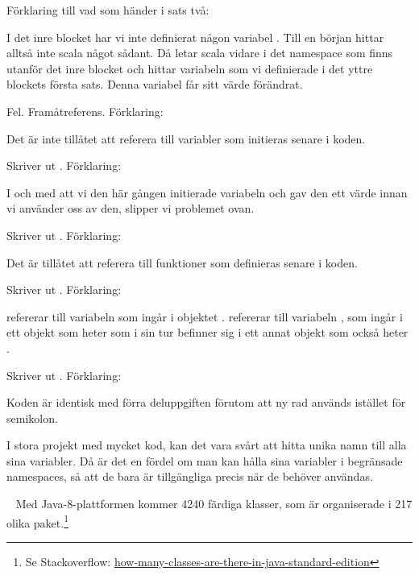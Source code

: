 Förklaring till vad som händer i sats två:

I det inre blocket har vi inte definierat någon variabel . Till en början hittar alltså inte scala något sådant. Då letar scala vidare i det namespace som finns utanför det inre blocket och hittar variabeln som vi definierade i det yttre blockets första sats. Denna variabel får sitt värde förändrat.

\SubtaskSolved  Fel. Framåtreferens. Förklaring:

Det är inte tillåtet att referera till variabler som initieras senare i koden.

\SubtaskSolved  Skriver ut . Förklaring:

I och med att vi den här gången initierade variabeln  och gav den ett värde innan vi använder oss av den, slipper vi problemet ovan.

\SubtaskSolved  Skriver ut . Förklaring:

Det är tillåtet att referera till funktioner som definieras senare i koden.

\SubtaskSolved  Skriver ut . Förklaring:

 refererar till variabeln  som ingår i objektet .
 refererar till variabeln , som ingår i ett objekt som heter  som i sin tur befinner sig i ett annat objekt som också heter .

\SubtaskSolved  Skriver ut . Förklaring:

Koden är identisk med förra deluppgiften förutom att ny rad används istället för semikolon.

\SubtaskSolved  I stora projekt med mycket kod, kan det vara svårt att hitta unika namn till alla sina variabler. Då är det en fördel om man kan hålla sina variabler i begränsade namespaces, så att de bara är tillgängliga precis när de behöver användas.



\QUESTEND









\QUESTBEGIN

\Task \label{task:package} \what~   Med Java-8-plattformen kommer 4240 färdiga klasser, som är organiserade i 217 olika paket.\footnote{Se Stackoverflow: \href{http://stackoverflow.com/questions/3112882/how-many-classes-are-there-in-java-standard-edition}{how-many-classes-are-there-in-java-standard-edition}}

